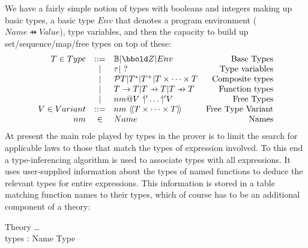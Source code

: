 We have a fairly simple notion of types
with booleans and integers making up basic types,
a basic type $Env$ that denotes
a program environment ($Name \pfun Value$),
type variables,
and then the capacity to build up set/sequence/map/free types on top
of these:
  $$\begin{array}{rclr}
     T \in Type &::=& \Bool | \Int  | Env & \mbox{Base Types}
  \\  &|&  \tau | ~? {} &\mbox{Type variables}
  \\  &|& \power T | T^* | T^+ | T \cross \cdots \cross T & \mbox{Composite types}
  \\  &|& T \fun T | T \pfun T | T \ffun T & \mbox{Function types}
  \\  &|& nm @ V~`\!|' \ldots `\!|' V & \mbox{Free Types}
  \\ V \in Variant &::=& nm~\ldata T \cross \cdots \cross T \rdata & \mbox{Free Type Variant}
  \\ nm &\in& Name & \mbox{Names}
  \end{array}$$
At present the main role played by types in the prover is to limit
the search for applicable laws to those that match the types of expression
involved.
To this end a type-inferencing algorithm is used to associate types
with all expressions. It uses user-supplied information about the types
of named functions to deduce the relevant types for entire expressions.
This information is stored in a table matching function names to their types,
which of course has to be an additional component of a theory:
\begin{schema}{Theory}
   \ldots
\\ types : Name \pfun Type
\end{schema}

